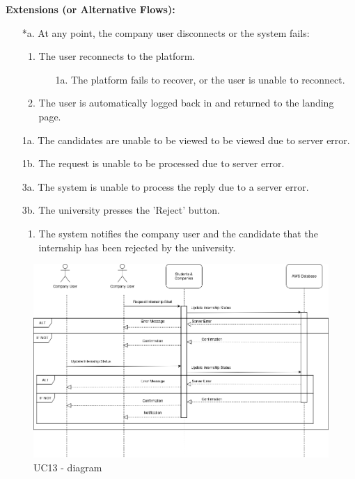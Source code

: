 \begin{itemize}[label={[\textbf{UC}]}, align=left, leftmargin=*]
    \textbf{Extensions (or Alternative Flows):} 
    \begin{enumerate}[label=\arabic*.]
        \item[*a.] At any point, the company user disconnects or the system fails:
            \begin{enumerate}[label=\arabic*.]
                \item The user reconnects to the platform.
                    \begin{enumerate}[label=\alph*.]
                        \item[1a.] The platform fails to recover, or the user is unable to reconnect.
                    \end{enumerate}
                 \item The user is automatically logged back in and returned to the landing page.
            \end{enumerate}
        \item[1a.] The candidates are unable to be viewed to be viewed due to server error.
        \item[1b.] The request is unable to be processed due to server error.
        \item[3a.] The system is unable to process the reply due to a server error. 
        \item[3b.] The university presses the 'Reject' button.
        \begin{enumerate}[label=\arabic*.]
                \item The system notifies the company user and the candidate that the internship has been rejected by the university.
            \end{enumerate}
        
        \end{enumerate}

        
     \begin{figure}[H]
    	\includegraphics[width=\textwidth,height=\textheight,keepaspectratio]{RASD-Latex/assets/Use Case Diagrams/UC13.png}
    	\caption{UC13 - diagram}
    	\label{fig:DataRequest}
    \end{figure}


\end{itemize}
